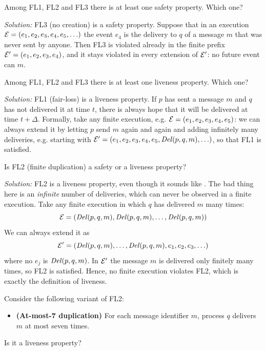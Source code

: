 \begin{framedprob}{}
  Among FL1, FL2 and FL3 there is at least one safety property. Which one?
\end{framedprob}

\textit{Solution:} FL3 (no creation) is a safety property. Suppose that in an execution $\mathcal{E} = (e_1, e_2, e_3, e_4, e_5, \ldots)$ the event $e_4$ is the delivery to $q$ of a message $m$ that was never sent by anyone. Then FL3 is violated already in the finite prefix $\mathcal{E}' = (e_1, e_2, e_3, e_4)$, and it stays violated in every extension of $\mathcal{E}'$: no future event can  $m$.

\begin{framedprob}{}
  Among FL1, FL2 and FL3 there is at least one liveness property. Which one?
\end{framedprob}

\textit{Solution:} FL1 (fair-loss) is a liveness property. If $p$ has sent a message $m$ and $q$ has not delivered it at time $t$, there is always hope that it will be delivered at time $t + \Delta$. Formally, take any finite execution, e.g. $\mathcal{E} = (e_1, e_2, e_3, e_4, e_5)$: we can always extend it by letting $p$ send $m$ again and again and adding infinitely many deliveries, e.g. starting with $\mathcal{E}' = (e_1, e_2, e_3, e_4, e_5, \mathit{Del}(p,q,m), \ldots)$, so that FL1 is satisfied.

\begin{framedprob}{}
  Is FL2 (finite duplication) a safety or a liveness property?
\end{framedprob}

\textit{Solution:} FL2 is a liveness property, even though it sounds like . The bad thing here is an \textit{infinite} number of deliveries, which can never be observed in a finite execution. Take any finite execution in which $q$ has delivered $m$ many times:
\[\mathcal{E} = (\mathit{Del}(p,q,m), \mathit{Del}(p,q,m), \ldots, \mathit{Del}(p,q,m))\]
We can always extend it as
\[\mathcal{E}' = (\mathit{Del}(p,q,m), \ldots, \mathit{Del}(p,q,m), e_1, e_2, e_3, \ldots)\]
where no $e_j$ is $\mathit{Del}(p,q,m)$. In $\mathcal{E}'$ the message $m$ is delivered only finitely many times, so FL2 is satisfied. Hence, no finite execution violates FL2, which is exactly the definition of liveness.

\begin{framedprob}{}
  Consider the following variant of FL2:
  \begin{itemize}
    \item[] \textbf{(At-most-7 duplication)} For each message identifier $m$, process $q$ delivers $m$ at most seven times.
  \end{itemize}
  Is it a liveness property?
\end{framedprob}


